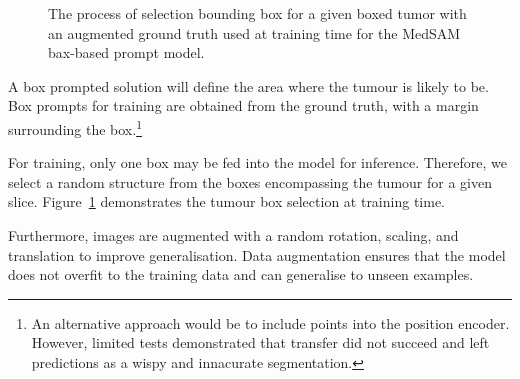 \documentclass[11pt,twoside]{report}
\begin{document}
\begin{figure}
  \centering
  \caption{The process of selection bounding box for a given boxed tumor with an augmented ground truth used at training time for the MedSAM bax-based prompt model.}\label{fig:box-prompt-sam-selection}
\end{figure}

A box prompted solution will define the area where the tumour is likely to be. Box prompts for training are obtained from the ground truth, with a margin surrounding the box.\footnote{An alternative approach would be to include points into the position encoder. However, limited tests demonstrated that transfer did not succeed and left predictions as a wispy and innacurate segmentation.}

For training, only one box may be fed into the model for inference. Therefore, we select a random structure from the boxes encompassing the tumour for a given slice. Figure~\ref{fig:box-prompt-sam-selection} demonstrates the tumour box selection at training time. 

Furthermore, images are augmented with a random rotation, scaling, and translation to improve generalisation. Data augmentation ensures that the model does not overfit to the training data and can generalise to unseen examples.

\end{document}
